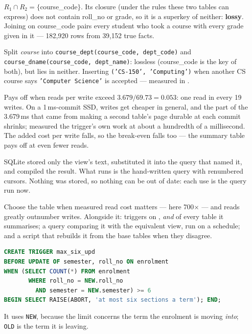 \begin{ans}
  \item $R_1 \cap R_2 = \{$course\_code$\}$. Its closure (under the rules
        these two tables can express) does not contain roll\_no or grade, so
        it is a superkey of neither: \textbf{lossy}. Joining on course\_code
        pairs every student who took a course with every grade given in it ---
        182{,}920 rows from 39{,}152 true facts.
  \item Split \textit{course} into \texttt{course\_dept(course\_code,
        dept\_code)} and \texttt{course\_dname(course\_code, dept\_name)}:
        lossless (course\_code is the key of both), but 
        lies in neither. Inserting \texttt{('CS-150', 'Computing')} when
        another CS course says \texttt{'Computer Science'} is accepted ---
        measured in .
  \item Pays off when reads per write exceed $3.679 / 69.73 = 0.053$: one
        read in every 19 writes. On a 1\,ms-commit SSD, writes get cheaper in
        general, and the part of the 3.679\,ms that came from making a second
        table's page durable at each commit shrinks;  measured the
        trigger's own work at about a hundredth of a millisecond. The added
        cost per write falls, so the
        break-even falls too --- the summary table pays off at even fewer
        reads.
\end{ans}

\begin{ans}
  \item SQLite stored only the view's  text, substituted it into
        the query that named it, and compiled the result. What runs is the
        hand-written query with renumbered cursors. Nothing was stored, so
        nothing can be out of date: each use is the query run now.
  \item Choose the table when measured read cost matters --- here 700$\times$
        --- and reads greatly outnumber writes. Alongside it: triggers on
        ,  \emph{and}  of every
        table it summarises; a query comparing it with the equivalent view,
        run on a schedule; and a script that rebuilds it from the base tables
        when they disagree.
  \item
\begin{lstlisting}[language=sql]
CREATE TRIGGER max_six_upd
BEFORE UPDATE OF semester, roll_no ON enrolment
WHEN (SELECT COUNT(*) FROM enrolment
       WHERE roll_no = NEW.roll_no
         AND semester = NEW.semester) >= 6
BEGIN SELECT RAISE(ABORT, 'at most six sections a term'); END;
\end{lstlisting}
        It uses \texttt{NEW},
        because the limit concerns the term the enrolment is moving
        \emph{into}; \texttt{OLD} is the term it is leaving.
\end{ans}


